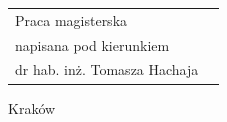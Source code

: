 \begin{titlepage}
\begin{center}
        \begin{flushright}
            \large
            \begin{tabular}{ll}
                Praca magisterska       \\
                napisana pod kierunkiem \\
                dr hab. inż. Tomasza Hachaja
            \end{tabular}
        \end{flushright}


        \vfill

        {\large Kraków \the\year}

    \end{center}
\end{titlepage}
